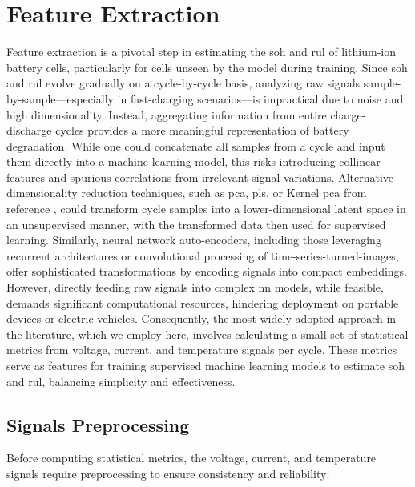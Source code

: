 \section{Feature Extraction} \label{sec:feature_extraction}

Feature extraction is a pivotal step in estimating the \acf{soh} and \acf{rul} of lithium-ion battery cells, particularly for cells unseen by the model during training. Since \ac{soh} and \ac{rul} evolve gradually on a cycle-by-cycle basis, analyzing raw signals sample-by-sample—especially in fast-charging scenarios—is impractical due to noise and high dimensionality. Instead, aggregating information from entire charge-discharge cycles provides a more meaningful representation of battery degradation. While one could concatenate all samples from a cycle and input them directly into a machine learning model, this risks introducing collinear features and spurious correlations from irrelevant signal variations. Alternative dimensionality reduction techniques, such as \acf{pca}, \acf{pls}, or Kernel \ac{pca} from reference \cite{scholkopf1998nonlinear}, could transform cycle samples into a lower-dimensional latent space in an unsupervised manner, with the transformed data then used for supervised learning. Similarly, neural network auto-encoders, including those leveraging recurrent architectures or convolutional processing of time-series-turned-images, offer sophisticated transformations by encoding signals into compact embeddings. However, directly feeding raw signals into complex \acf{nn} models, while feasible, demands significant computational resources, hindering deployment on portable devices or electric vehicles. Consequently, the most widely adopted approach in the literature, which we employ here, involves calculating a small set of statistical metrics from voltage, current, and temperature signals per cycle. These metrics serve as features for training supervised machine learning models to estimate \ac{soh} and \ac{rul}, balancing simplicity and effectiveness.

\subsection{Signals Preprocessing}

Before computing statistical metrics, the voltage, current, and temperature signals require preprocessing to ensure consistency and reliability:

